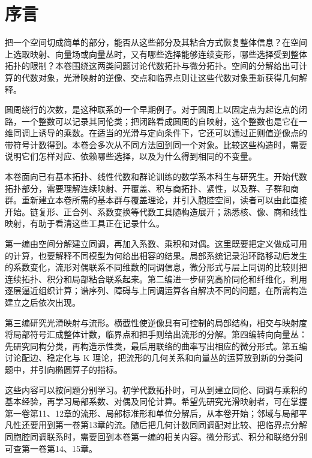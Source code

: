 \chapter*{序言}
把一个空间切成简单的部分，能否从这些部分及其粘合方式恢复整体信息？在空间上选取映射、向量场或向量丛时，又有哪些选择能够连续变形，哪些选择受到整体拓扑的限制？本卷围绕这两类问题讨论代数拓扑与微分拓扑。空间的分解给出可计算的代数对象，光滑映射的逆像、交点和临界点则让这些代数对象重新获得几何解释。

\ProseParagraphBreak

圆周绕行的次数，是这种联系的一个早期例子。对于圆周上以固定点为起讫点的闭路，一个整数可以记录其同伦类；把闭路看成圆周的自映射，这个整数也是它在一维同调上诱导的乘数。在适当的光滑与定向条件下，它还可以通过正则值逆像点的带符号计数得到。本卷会多次从不同方法回到同一个对象。比较这些构造时，需要说明它们怎样对应、依赖哪些选择，以及为什么得到相同的不变量。

\ProseParagraphBreak

本卷面向已有基本拓扑、线性代数和群论训练的数学系本科生与研究生。开始代数拓扑部分，需要理解连续映射、开覆盖、积与商拓扑、紧性，以及群、子群和商群。重新建立本卷所需的基本群与覆盖理论，并引入胞腔空间，读者可以由此直接开始。链复形、正合列、系数变换等代数工具随构造展开；熟悉核、像、商和线性映射，有助于看清这些工具正在记录什么。

\ProseParagraphBreak

第一编由空间分解建立同调，再加入系数、乘积和对偶。这里既要把定义做成可用的计算，也要解释不同模型为何给出相容的结果。局部系统记录沿环路移动后发生的系数变化，流形对偶联系不同维数的同调信息，微分形式与层上同调的比较则把连续拓扑、积分和局部粘合联系起来。第二编进一步研究高阶同伦和纤维化，利用逐层逼近组织计算；谱序列、障碍与上同调运算各自解决不同的问题，在所需构造建立之后依次出现。

\ProseParagraphBreak

第三编研究光滑映射与流形。横截性使逆像具有可控制的局部结构，相交与映射度将局部符号汇成整体计数，临界点和把手则给出流形的分解。第四编转向向量丛：先研究同构分类，再构造示性类，最后用联络的曲率写出相应的微分形式。第五编讨论配边、稳定化与 K 理论，把流形的几何关系和向量丛的运算放到新的分类问题中，并引向椭圆算子的指标。

\ProseParagraphBreak

这些内容可以按问题分别学习。初学代数拓扑时，可从到建立同伦、同调与乘积的基本经验，再学习局部系数、对偶及同伦计算。希望先研究光滑映射者，可在掌握第一卷第11、12章的流形、局部标准形和单位分解后，从本卷开始；邻域与局部平凡性还要用到第一卷第13章的流。随后把几何计数同同调配对比较、把临界点分解同胞腔同调联系时，需要回到本卷第一编的相关内容。微分形式、积分和联络分别可查第一卷第14、15章。

